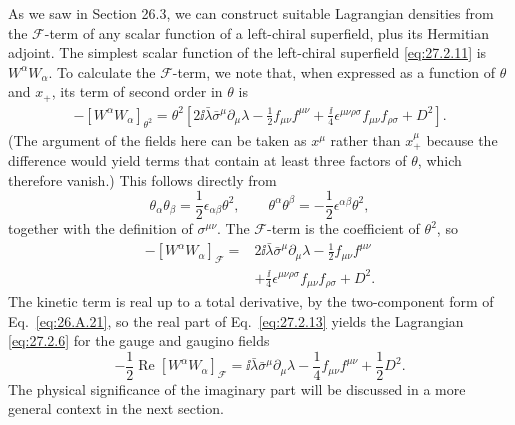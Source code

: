 As we saw in Section 26.3, we can construct suitable Lagrangian densities
from the \(\mathcal{F}\)-term of any scalar function of a left-chiral
superfield, plus its Hermitian adjoint. The simplest scalar function of the
left-chiral superfield \eqref{eq:27.2.11} is
\(W^\alpha W_\alpha\).
To calculate the \(\mathcal{F}\)-term, we note that, when expressed as a
function of \(\theta\) and \(x_+\), its term of second order in \(\theta\)
is
\[
  \begin{aligned}
  -[W^\alpha W_\alpha]_{\theta^2}
  =\theta^2\left[
    2\ii\bar\lambda\bar\sigma^\mu\partial_\mu\lambda
    -\frac12f_{\mu\nu}f^{\mu\nu}
    +\frac{\ii}{4}\epsilon^{\mu\nu\rho\sigma}
       f_{\mu\nu}f_{\rho\sigma}
    +D^2\right].
  \end{aligned}
\]
(The argument of the fields here can be taken as \(x^\mu\) rather than
\(x_+^\mu\) because the difference would yield terms that contain at least
three factors of \(\theta\), which therefore vanish.) This follows directly
from
\[
  \theta_\alpha\theta_\beta
  =\frac12\epsilon_{\alpha\beta}\theta^2,
  \qquad
  \theta^\alpha\theta^\beta
  =-\frac12\epsilon^{\alpha\beta}\theta^2,
\]
together with the definition of \(\sigma^{\mu\nu}\). The
\(\mathcal{F}\)-term is the coefficient of \(\theta^2\), so
\begin{equation}
  \begin{aligned}
  -[W^\alpha W_\alpha]_{\mathcal{F}}
  ={}&2\ii\bar\lambda\bar\sigma^\mu\partial_\mu\lambda
    -\frac12f_{\mu\nu}f^{\mu\nu}
  \\
  &+\frac{\ii}{4}\epsilon^{\mu\nu\rho\sigma}
    f_{\mu\nu}f_{\rho\sigma}+D^2.
  \end{aligned}
  \tag{27.2.13}\label{eq:27.2.13}
\end{equation}
The kinetic term is real up to a total derivative, by the two-component
form of Eq.~\eqref{eq:26.A.21}, so the real
part of Eq.~\eqref{eq:27.2.13} yields the Lagrangian
\eqref{eq:27.2.6} for the gauge and gaugino fields
\begin{equation}
  -\frac12\operatorname{Re}\left[
    W^\alpha W_\alpha
  \right]_{\mathcal{F}}
  =\ii\bar\lambda\bar\sigma^\mu\partial_\mu\lambda
  -\frac14f_{\mu\nu}f^{\mu\nu}
  +\frac12D^2.
  \tag{27.2.14}\label{eq:27.2.14}
\end{equation}
The physical significance of the imaginary part will be discussed in a
more general context in the next section.


